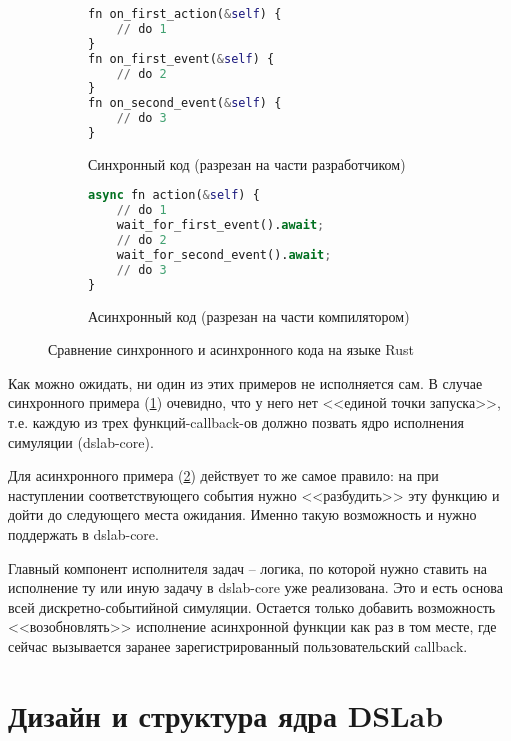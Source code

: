 \begin{figure}[H]
    \centering
    \begin{subfigure}[b]{0.45\linewidth}
        \centering
        \begin{lstlisting}[language=Python]
fn on_first_action(&self) {
    // do 1
}
fn on_first_event(&self) {
    // do 2
}
fn on_second_event(&self) {
    // do 3
}
    \end{lstlisting}
        \caption{Синхронный код (разрезан на части разработчиком)}
        \label{sync-async-example:sync}
    \end{subfigure}
    \hfill
    \begin{subfigure}[b]{0.45\linewidth}
        \centering
        \begin{lstlisting}[language=Python]
async fn action(&self) {
    // do 1
    wait_for_first_event().await;
    // do 2 
    wait_for_second_event().await;
    // do 3
}
    \end{lstlisting}
        \caption{Асинхронный код (разрезан на части компилятором)}
        \label{sync-async-example:async}
    \end{subfigure}
\caption{Сравнение синхронного и асинхронного кода на языке Rust}
\label{sync-async-example}
\end{figure}

Как можно ожидать, ни один из этих примеров не исполняется сам. В случае синхронного примера (\ref{sync-async-example:sync}) очевидно, что у него нет <<единой точки запуска>>, т.е. каждую из трех функций-callback-ов должно позвать ядро исполнения симуляции (dslab-core). 

Для асинхронного примера (\ref{sync-async-example:async}) действует то же самое правило: на при наступлении соответствующего события нужно <<разбудить>> эту функцию и дойти до следующего места ожидания. Именно такую возможность и нужно поддержать в dslab-core. 

Главный компонент исполнителя задач -- логика, по которой нужно ставить на исполнение ту или иную задачу в dslab-core уже реализована. Это и есть основа всей дискретно-событийной симуляции. Остается только добавить возможность <<возобновлять>> исполнение асинхронной функции как раз в том месте, где сейчас вызывается заранее зарегистрированный пользовательский callback.


\section{Дизайн и структура ядра DSLab}

